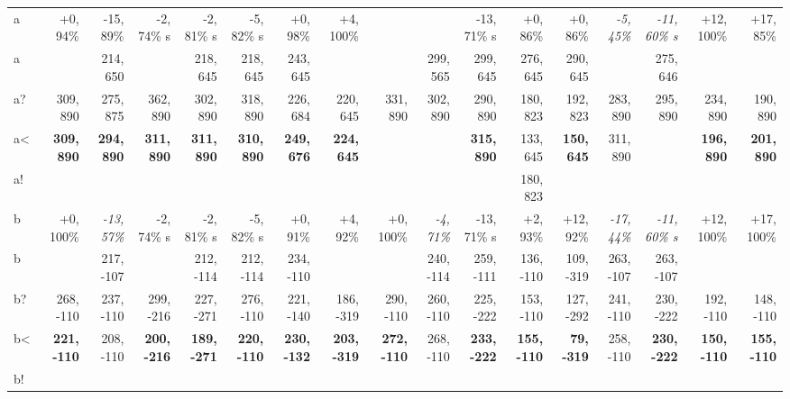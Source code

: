 \begin{table}[p]
{\begin{tabular}{lrrrrrrrrrrrrrrrr}
a~ & +0, 94\% & -15, 89\% & -2, 74\% s & -2, 81\% s & -5, 82\% s & +0, 98\% & +4, 100\% &  &  & -13, 71\% s & +0, 86\% & +0, 86\% & \textit{-5, 45\%} & \textit{-11, 60\% s} & +12, 100\% & +17, 85\% \\
a &  & 214, 650 &  & 218, 645 & 218, 645 & 243, 645 &  &  & 299, 565 & 299, 645 & 276, 645 & 290, 645 &  & 275, 646 &  &  \\
a? & 309, 890 & 275, 875 & 362, 890 & 302, 890 & 318, 890 & 226, 684 & 220, 645 & 331, 890 & 302, 890 & 290, 890 & 180, 823 & 192, 823 & 283, 890 & 295, 890 & 234, 890 & 190, 890 \\
a< & \textbf{309, 890} & \textbf{294, 890} & \textbf{311, 890} & \textbf{311, 890} & \textbf{310, 890} & \textbf{249, 676} & \textbf{224, 645} &  &  & \textbf{315, 890} & 133, 645 & \textbf{150, 645} & 311, 890 &  & \textbf{196, 890} & \textbf{201, 890} \\
a! &  &  &  &  &  &  &  &  &  &  & 180, 823 &  &  &  &  &  \\
b~ & +0, 100\% & \textit{-13, 57\%} & -2, 74\% s & -2, 81\% s & -5, 82\% s & +0, 91\% & +4, 92\% & +0, 100\% & \textit{-4, 71\%} & -13, 71\% s & +2, 93\% & +12, 92\% & \textit{-17, 44\%} & \textit{-11, 60\% s} & +12, 100\% & +17, 100\% \\
b &  & 217, -107 &  & 212, -114 & 212, -114 & 234, -110 &  &  & 240, -114 & 259, -111 & 136, -110 & 109, -319 & 263, -107 & 263, -107 &  &  \\
b? & 268, -110 & 237, -110 & 299, -216 & 227, -271 & 276, -110 & 221, -140 & 186, -319 & 290, -110 & 260, -110 & 225, -222 & 153, -110 & 127, -292 & 241, -110 & 230, -222 & 192, -110 & 148, -110 \\
b< & \textbf{221, -110} & 208, -110 & \textbf{200, -216} & \textbf{189, -271} & \textbf{220, -110} & \textbf{230, -132} & \textbf{203, -319} & \textbf{272, -110} & 268, -110 & \textbf{233, -222} & \textbf{155, -110} & \textbf{79, -319} & 258, -110 & \textbf{230, -222} & \textbf{150, -110} & \textbf{155, -110} \\
b! &  &  &  &  &  &  &  &  &  &  &  &  &  &  &  &  \\

\end{tabular}
}
\end{table}
\clearpage



